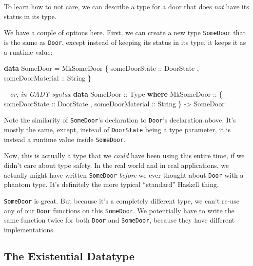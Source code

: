 \documentclass[]{article}
\newenvironment{Shaded}{}{}
\newcommand{\CommentTok}[1]{\textcolor[rgb]{0.38,0.63,0.69}{\textit{#1}}}
\newcommand{\DataTypeTok}[1]{\textcolor[rgb]{0.56,0.13,0.00}{#1}}
\newcommand{\FunctionTok}[1]{\textcolor[rgb]{0.02,0.16,0.49}{#1}}
\newcommand{\KeywordTok}[1]{\textcolor[rgb]{0.00,0.44,0.13}{\textbf{#1}}}
\newcommand{\NormalTok}[1]{#1}
\newcommand{\OtherTok}[1]{\textcolor[rgb]{0.00,0.44,0.13}{#1}}
\begin{document}
To learn how to not care, we can describe a type for a door that does \emph{not}
have its status in its type.

We have a couple of options here. First, we can create a new type
\texttt{SomeDoor} that is the same as \texttt{Door}, except instead of keeping
its status in its type, it keeps it as a runtime value:

\begin{Shaded}
\begin{Highlighting}[]
\KeywordTok{data} \DataTypeTok{SomeDoor} \FunctionTok{=} \DataTypeTok{MkSomeDoor}
\NormalTok{    \{}\OtherTok{ someDoorState    ::} \DataTypeTok{DoorState}
\NormalTok{    ,}\OtherTok{ someDoorMaterial ::} \DataTypeTok{String}
\NormalTok{    \}}

\CommentTok{-- or, in GADT syntax}
\KeywordTok{data} \DataTypeTok{SomeDoor}\OtherTok{ ::} \DataTypeTok{Type} \KeywordTok{where}
    \DataTypeTok{MkSomeDoor} \OtherTok{::}
\NormalTok{      \{}\OtherTok{ someDoorState    ::} \DataTypeTok{DoorState}
\NormalTok{      ,}\OtherTok{ someDoorMaterial ::} \DataTypeTok{String}
\NormalTok{      \} }\OtherTok{->} \DataTypeTok{SomeDoor}
\end{Highlighting}
\end{Shaded}

Note the similarity of \texttt{SomeDoor}'s declaration to \texttt{Door}'s
declaration above. It's mostly the same, except, instead of \texttt{DoorState}
being a type parameter, it is instead a runtime value inside \texttt{SomeDoor}.

Now, this is actually a type that we \emph{could} have been using this entire
time, if we didn't care about type safety. In the real world and in real
applications, we actually might have written \texttt{SomeDoor} \emph{before} we
ever thought about \texttt{Door} with a phantom type. It's definitely the more
typical ``standard'' Haskell thing.

\texttt{SomeDoor} is great. But because it's a completely different type, we
can't re-use any of our \texttt{Door} functions on this \texttt{SomeDoor}. We
potentially have to write the same function twice for both \texttt{Door} and
\texttt{SomeDoor}, because they have different implementations.

\hypertarget{the-existential-datatype}{%
\subsection{The Existential Datatype}\label{the-existential-datatype}}
\end{document}
